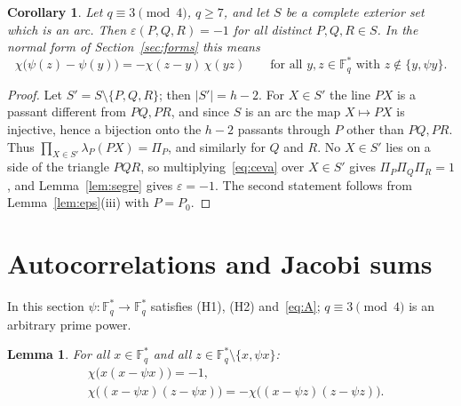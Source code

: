 \documentclass[11pt]{amsart}
\newtheorem{lemma}[theorem]{Lemma}
\newtheorem{corollary}[theorem]{Corollary}
\theoremstyle{definition}
\theoremstyle{remark}
\numberwithin{equation}{section}
\newcommand{\Fs}{\mathbb{F}_q^{*}}
\begin{document}
\begin{corollary}\label{cor:A}
Let $q\equiv3\pmod4$, $q\ge7$, and let $S$ be a complete exterior set which is an arc. Then $\varepsilon(P,Q,R)=-1$ for all distinct
$P,Q,R\in S$. In the normal form of Section~\ref{sec:forms} this means
\begin{equation}\label{eq:A}
\chi\bigl(\psi(z)-\psi(y)\bigr)=-\chi(z-y)\,\chi(yz)\qquad\text{for all }y,z\in\Fs\text{ with }z\notin\{y,\psi y\}.\tag{A}
\end{equation}
\end{corollary}

\begin{proof}
Let $S'=S\setminus\{P,Q,R\}$; then $|S'|=h-2$. For $X\in S'$ the line $PX$ is a passant different from $PQ,PR$, and since $S$ is an
arc the map $X\mapsto PX$ is injective, hence a bijection onto the $h-2$ passants through $P$ other than $PQ,PR$. Thus
$\prod_{X\in S'}\lambda_P(PX)=\Pi_P$, and similarly for $Q$ and $R$. No $X\in S'$ lies on a side of the triangle $PQR$, so
multiplying~\eqref{eq:ceva} over $X\in S'$ gives $\Pi_P\Pi_Q\Pi_R=1$, and Lemma~\ref{lem:segre} gives $\varepsilon=-1$. The second
statement follows from Lemma~\ref{lem:eps}(iii) with $P=P_0$.
\end{proof}

\section{Autocorrelations and Jacobi sums}\label{sec:jacobi}

In this section $\psi\colon\Fs\to\Fs$ satisfies (H1), (H2) and~\eqref{eq:A}; $q\equiv3\pmod 4$ is an arbitrary prime power.

\begin{lemma}\label{lem:autocorr}
For all $x\in\Fs$ and all $z\in\Fs\setminus\{x,\psi x\}$:
\begin{align}
&\chi\bigl(x(x-\psi x)\bigr)=-1, \tag{B}\label{eq:B}\\
&\chi\bigl((x-\psi x)(z-\psi x)\bigr)=-\chi\bigl((x-\psi z)(z-\psi z)\bigr). \tag{C}\label{eq:C}
\end{align}
\end{lemma}
\end{document}
